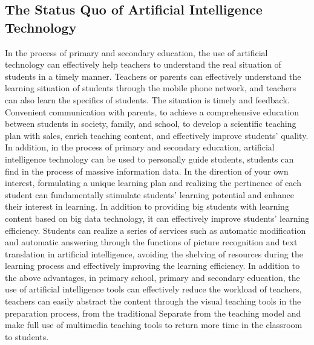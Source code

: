 \documentclass[11pt,en,authoryear]{elegantpaper}
\begin{document}
\subsection{The Status Quo of Artificial Intelligence Technology}
In the process of primary and secondary education, the use of artificial technology can effectively help teachers to understand the real situation of students in a timely manner. Teachers or parents can effectively understand the learning situation of students through the mobile phone network, and teachers can also learn the specifics of students. The situation is timely and feedback. Convenient communication with parents, to achieve a comprehensive education between students in society, family, and school, to develop a scientific teaching plan with sales, enrich teaching content, and effectively improve students' quality. In addition, in the process of primary and secondary education, artificial intelligence technology can be used to personally guide students, students can find in the process of massive information data. In the direction of your own interest, formulating a unique learning plan and realizing the pertinence of each student can fundamentally stimulate students' learning potential and enhance their interest in learning. In addition to providing big students with learning content based on big data technology, it can effectively improve students' learning efficiency. Students can realize a series of services such as automatic modification and automatic answering through the functions of picture recognition and text translation in artificial intelligence, avoiding the shelving of resources during the learning process and effectively improving the learning efficiency. In addition to the above advantages, in primary school, primary and secondary education, the use of artificial intelligence tools can effectively reduce the workload of teachers, teachers can easily abstract the content through the visual teaching tools in the preparation process, from the traditional Separate from the teaching model and make full use of multimedia teaching tools to return more time in the classroom to students.
\end{document}
